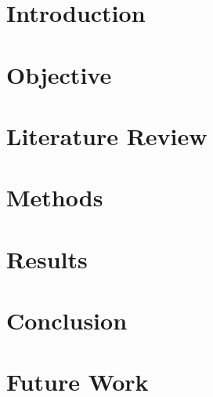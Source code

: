 \documentclass[12pt]{article}
\begin{document}
	\maketitle
	\tableofcontents

	\newpage

	\section{Introduction}

	\section{Objective}

	\section{Literature Review}

	\section{Methods}

	\section{Results}

	\section{Conclusion}
	
	\section{Future Work}


	\nocite{*}

	\newpage %
	\backmatter
	\printbibliography

	\newpage %
	\printindex

	\newpage %
\end{document}
